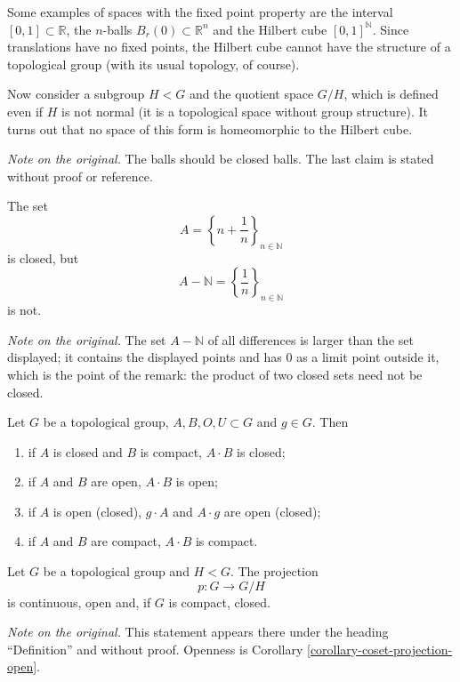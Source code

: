 Some examples of spaces with the fixed
point property are the interval
$[0,1]\subset\mathbb{R}$, the $n$-balls
$B_r(0)\subset\mathbb{R}^n$ and the
Hilbert cube $[0,1]^{\mathbb{N}}$. Since
translations have no fixed points, the
Hilbert cube cannot have the structure
of a topological group (with its usual
topology, of course).

Now consider a subgroup $H<G$ and the
quotient space $G/H$, which is defined
even if $H$ is not normal (it is a
topological space without group
structure). It turns out that no space
of this form is homeomorphic to the
Hilbert cube.

\noindent
{\it Note on the original.} The balls
should be closed balls. The last claim
is stated without proof or reference.

\begin{remark}
\label{remark-sum-of-closed-sets}
The set
$$
A=\left\{n+\frac{1}{n}
\right\}_{n\in\mathbb{N}}
$$
is closed, but
$$
A-\mathbb{N}
=\left\{\frac{1}{n}
\right\}_{n\in\mathbb{N}}
$$
is not.
\end{remark}

\noindent
{\it Note on the original.} The set
$A-\mathbb{N}$ of all differences is
larger than the set displayed; it
contains the displayed points and has
$0$ as a limit point outside it, which
is the point of the remark: the product
of two closed sets need not be closed.

\begin{theorem}
\label{theorem-products-of-subsets}
Let $G$ be a topological group,
$A,B,O,U\subset G$ and $g\in G$. Then
\begin{enumerate}
\item if $A$ is closed and $B$ is
compact, $A\cdot B$ is closed;
\item if $A$ and $B$ are open,
$A\cdot B$ is open;
\item if $A$ is open (closed),
$g\cdot A$ and $A\cdot g$ are open
(closed);
\item if $A$ and $B$ are compact,
$A\cdot B$ is compact.
\end{enumerate}
\end{theorem}

\begin{proposition}
\label{proposition-coset-projection}
Let $G$ be a topological group and
$H<G$. The projection
$$
p:G\to G/H
$$
is continuous, open and, if $G$ is
compact, closed.
\end{proposition}

\noindent
{\it Note on the original.} This
statement appears there under the
heading ``Definition'' and without
proof. Openness is
Corollary
\ref{corollary-coset-projection-open}.

